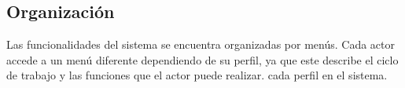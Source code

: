   
  
\subsection{Organización}
Las funcionalidades del sistema se encuentra organizadas por menús. Cada actor accede a un menú diferente dependiendo de su perfil, ya que este describe el ciclo de trabajo y las funciones que el actor puede realizar.
cada perfil en el sistema.

